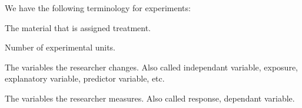 \documentclass[12pt]{article}
\theoremstyle{definition}
\begin{document}
We have the following terminology for experiments:
\begin{description}[leftmargin=!, labelwidth=\widthof{\bfseries Experimental Unit},itemsep=1pt]
  \item[\censor{Experimental Unit}] The material that is assigned treatment.
  \item[\censor{Sample Size}] Number of experimental units.
  \item[\censor{Treatment}] The variables the researcher changes. Also called independant variable, exposure, explanatory variable, predictor variable, etc.
  \item[\censor{Outcome}] The variables the researcher measures. Also called response, dependant variable.
\end{description}


\end{document}

